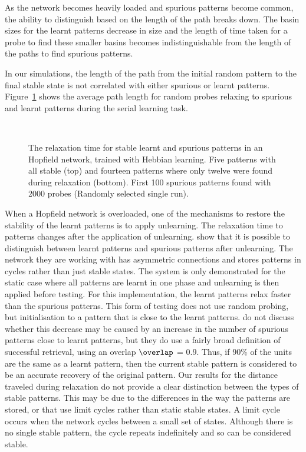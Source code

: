 As the network becomes heavily loaded and spurious patterns become common, the ability to distinguish based on the length of the path breaks down.  The basin sizes for the learnt patterns decrease in size and the length of time taken for a probe to find these smaller basins becomes indistinguishable from the length of the paths to find spurious patterns.

In our simulations, the length of the path from the initial random pattern to the final stable state is not correlated with either spurious or learnt patterns.  Figure~\ref{fig:RTmeasure} shows the average path length for random probes relaxing to spurious and learnt patterns during the serial learning task.

\begin{figure}[p]
	\small
	\center
	
	\vspace{1cm}\\
	
	\caption{The relaxation time for stable learnt and spurious patterns in an  Hopfield network, trained with Hebbian learning.  Five patterns with all stable (top) and fourteen patterns where only twelve were found during relaxation (bottom). First 100 spurious patterns found with 2000 probes (Randomly selected single run).}
	\label{fig:RTmeasure}
\end{figure}

When a Hopfield network is overloaded, one of the mechanisms to restore the stability of the learnt patterns is to apply unlearning.  The relaxation time to patterns changes after the application of unlearning.  
\citet{Horas2002} show that it is possible to distinguish between learnt patterns and spurious patterns after unlearning.  The network they are working with has asymmetric connections and stores patterns in cycles rather than just stable states.  The system is only demonstrated for the static case where all patterns are learnt in one phase and unlearning is then applied before testing.  For this implementation, the learnt patterns relax faster than the spurious patterns.  This form of testing does not use random probing, but initialisation to a pattern that is close to the learnt patterns. \citeauthor{Horas2002} do not discuss whether this decrease may be caused by an increase in the number of spurious patterns close to learnt patterns, but they do use a fairly broad definition of successful retrieval, using an overlap $\overlap$ = 0.9.  Thus, if 90\% of the units are the same as a learnt pattern,  then the current stable pattern is considered to be an accurate recovery of the original pattern.  Our results for the distance traveled during relaxation do not provide a clear distinction between the types of stable patterns.  This may be due to the differences in the way the patterns are stored, or that \citet{Horas2002} use limit cycles rather than static stable states.  A limit cycle occurs when the network cycles between a small set of states.  Although there is no single stable pattern, the cycle repeats indefinitely and so can be considered stable.


